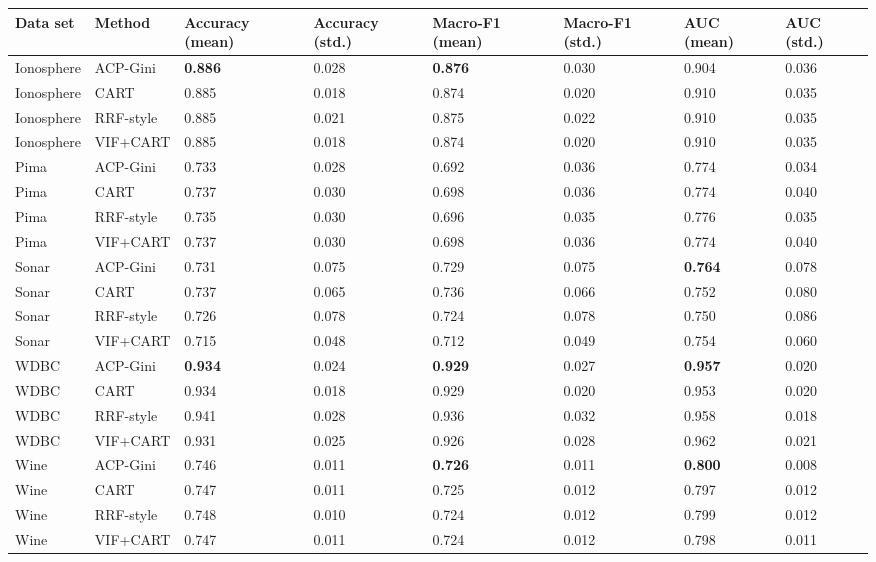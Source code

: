 \begin{tabular}{llllllll}
\toprule
Data set & Method & Accuracy (mean) & Accuracy (std.) & Macro-F1 (mean) & Macro-F1 (std.) & AUC (mean) & AUC (std.) \\
\midrule
Ionosphere & ACP-Gini & \textbf{0.886} & 0.028 & \textbf{0.876} & 0.030 & 0.904 & 0.036 \\
Ionosphere & CART & 0.885 & 0.018 & 0.874 & 0.020 & 0.910 & 0.035 \\
Ionosphere & RRF-style & 0.885 & 0.021 & 0.875 & 0.022 & 0.910 & 0.035 \\
Ionosphere & VIF+CART & 0.885 & 0.018 & 0.874 & 0.020 & 0.910 & 0.035 \\
Pima & ACP-Gini & 0.733 & 0.028 & 0.692 & 0.036 & 0.774 & 0.034 \\
Pima & CART & 0.737 & 0.030 & 0.698 & 0.036 & 0.774 & 0.040 \\
Pima & RRF-style & 0.735 & 0.030 & 0.696 & 0.035 & 0.776 & 0.035 \\
Pima & VIF+CART & 0.737 & 0.030 & 0.698 & 0.036 & 0.774 & 0.040 \\
Sonar & ACP-Gini & 0.731 & 0.075 & 0.729 & 0.075 & \textbf{0.764} & 0.078 \\
Sonar & CART & 0.737 & 0.065 & 0.736 & 0.066 & 0.752 & 0.080 \\
Sonar & RRF-style & 0.726 & 0.078 & 0.724 & 0.078 & 0.750 & 0.086 \\
Sonar & VIF+CART & 0.715 & 0.048 & 0.712 & 0.049 & 0.754 & 0.060 \\
WDBC & ACP-Gini & \textbf{0.934} & 0.024 & \textbf{0.929} & 0.027 & \textbf{0.957} & 0.020 \\
WDBC & CART & 0.934 & 0.018 & 0.929 & 0.020 & 0.953 & 0.020 \\
WDBC & RRF-style & 0.941 & 0.028 & 0.936 & 0.032 & 0.958 & 0.018 \\
WDBC & VIF+CART & 0.931 & 0.025 & 0.926 & 0.028 & 0.962 & 0.021 \\
Wine & ACP-Gini & 0.746 & 0.011 & \textbf{0.726} & 0.011 & \textbf{0.800} & 0.008 \\
Wine & CART & 0.747 & 0.011 & 0.725 & 0.012 & 0.797 & 0.012 \\
Wine & RRF-style & 0.748 & 0.010 & 0.724 & 0.012 & 0.799 & 0.012 \\
Wine & VIF+CART & 0.747 & 0.011 & 0.724 & 0.012 & 0.798 & 0.011 \\
\bottomrule
\end{tabular}
